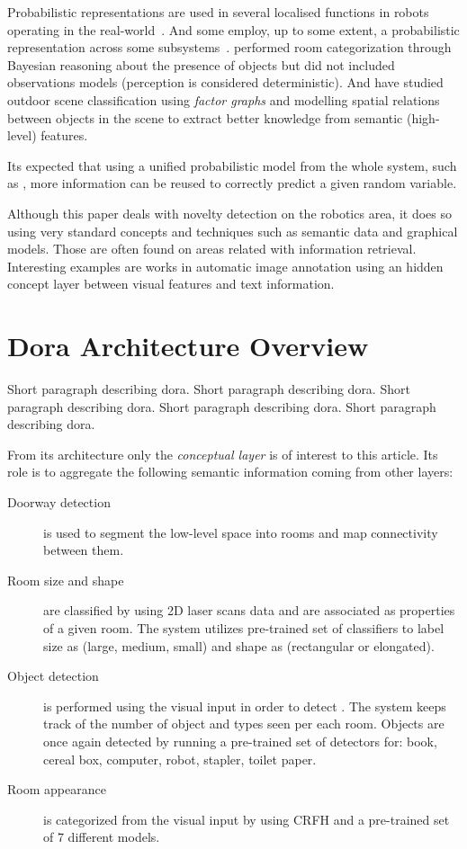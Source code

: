 \documentclass[runningheads,a4paper]{llncs}
\begin{document}
Probabilistic representations are used in several localised functions in robots operating in the real-world~\cite{gross2009toomas,maierprobabilistic}. And some employ, up to some extent, a probabilistic representation across some subsystems~\cite{kraft2008exploration}.
\cite{vasudevan2008bayesian} performed room categorization through Bayesian reasoning about the presence of objects but did not included observations models (perception is considered deterministic).
And \cite{boutell2006factor} have studied outdoor scene classification using \emph{factor graphs} and modelling spatial relations between objects in the scene to extract better knowledge from semantic (high-level) features.

Its expected that using a unified probabilistic model from the whole system, such as \cite{pronobis2011exploiting}, more information can be reused to correctly predict a given random variable.

Although this paper deals with novelty detection on the robotics area, it does so using very
standard concepts and techniques such as semantic data and graphical models.
Those are often found on areas related with information retrieval.
Interesting examples are works in automatic image annotation using an hidden concept layer between visual features and text information\cite{zhang2005probabilistic}.

\section{Dora Architecture Overview}
Short paragraph describing dora. Short paragraph describing dora. Short paragraph describing dora. Short paragraph describing dora. Short paragraph describing dora.

From its architecture only the \emph{conceptual layer} is of interest to this article.
Its role is to aggregate the following semantic information coming from other layers:

\begin{description}
 \item[Doorway detection] is used to segment the low-level space into rooms and map connectivity between them.
 \item[Room size and shape] are classified by using 2D laser scans data and are associated as properties of a given room. The system utilizes pre-trained set of classifiers to label size as (large, medium, small) and shape as (rectangular or elongated).
 \item[Object detection] is performed using the visual input in order to detect . The system keeps track of the number of object and types seen per each room. Objects are once again detected by running a pre-trained set of detectors for: book, cereal box, computer, robot, stapler, toilet paper.
 \item[Room appearance] is categorized from the visual input by using CRFH and a pre-trained set of 7 different models.
\end{description}
\end{document}
